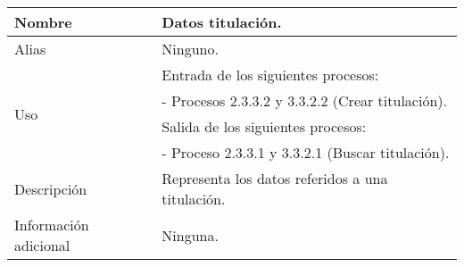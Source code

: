 \begin{center}
  \begin{tabular}{| l | p{9cm} |}
    \hline
    Nombre & \textbf{Datos titulación}.\\
    \hline
    Alias & Ninguno.\\
    \hline
    \multirow{4}{*}{Uso} & Entrada de los siguientes procesos:\\
                         & - Procesos 2.3.3.2 y 3.3.2.2 (Crear titulación).\\
                         & Salida de los siguientes procesos:\\
                         & - Proceso 2.3.3.1 y 3.3.2.1 (Buscar titulación).\\
    \hline
    Descripción & Representa los datos referidos a una titulación.\\
    \hline
    Información adicional & Ninguna.\\
    \hline
  \end{tabular}
\end{center}
